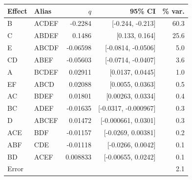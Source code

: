 \begin{tabular}{@{}llrrr@{}}
\toprule
Effect & Alias & $q$ & 95\% CI & \% var. \\
\midrule
B & ACDEF & -0.2284 & [-0.244, -0.213] & 60.3 \\
C & ABDEF & 0.1486 & [0.133, 0.164] & 25.6 \\
E & ABCDF & -0.06598 & [-0.0814, -0.0506] & 5.0 \\
CD & ABEF & -0.05603 & [-0.0714, -0.0407] & 3.6 \\
A & BCDEF & 0.02911 & [0.0137, 0.0445] & 1.0 \\
EF & ABCD & 0.02088 & [0.0055, 0.0363] & 0.5 \\
AC & BDEF & 0.01801 & [0.00263, 0.0334] & 0.4 \\
BC & ADEF & -0.01635 & [-0.0317, -0.000967] & 0.3 \\
D & ABCEF & 0.01472 & [-0.000661, 0.0301] & 0.3 \\
ACE & BDF & -0.01157 & [-0.0269, 0.00381] & 0.2 \\
ABF & CDE & -0.01118 & [-0.0266, 0.0042] & 0.1 \\
BD & ACEF & 0.008833 & [-0.00655, 0.0242] & 0.1 \\
Error & & & & 2.1 \\
\bottomrule
\end{tabular}
